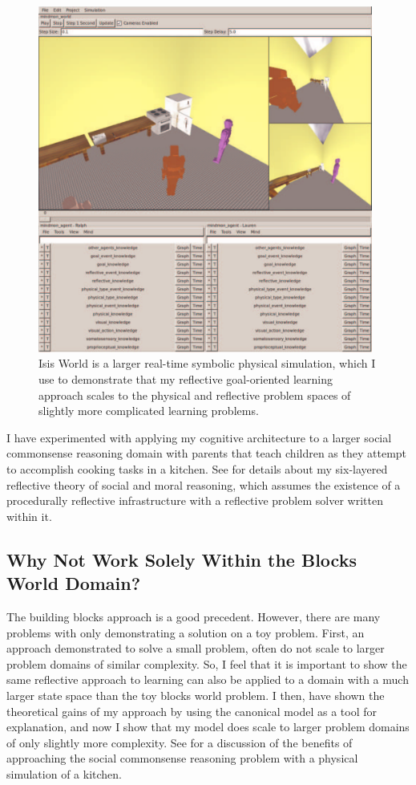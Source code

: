 \begin{figure}[bth]
  \center
  \includegraphics[width=11cm]{gfx/mindmon-isis_world-screenshot-1}
  \caption[Isis World is a larger physical simulation than the Blocks
    World toy problem]{Isis World is a larger real-time symbolic
    physical simulation, which I use to demonstrate that my reflective
    goal-oriented learning approach scales to the physical and
    reflective problem spaces of slightly more complicated learning
    problems.}
  \label{fig:mindmon-isis_world-screenshot-1}
\end{figure}

I have experimented with applying my cognitive architecture to a
larger social commonsense reasoning domain with parents that teach
children as they attempt to accomplish cooking tasks in a kitchen.
See \cite{morgan:2011} for details about my six-layered reflective
theory of social and moral reasoning, which assumes the existence of a
procedurally reflective infrastructure with a reflective problem
solver written within it.

\subsection{Why Not Work Solely Within the Blocks World Domain?}

The building blocks approach is a good precedent.  However, there are
many problems with only demonstrating a solution on a toy problem.
First, an approach demonstrated to solve a small problem, often do not
scale to larger problem domains of similar complexity.  So, I feel
that it is important to show the same reflective approach to learning
can also be applied to a domain with a much larger state space than
the toy blocks world problem.  I then, have shown the theoretical
gains of my approach by using the canonical model as a tool for
explanation, and now I show that my model does scale to larger
problem domains of only slightly more complexity.  See
\cite{smith:2010} for a discussion of the benefits of approaching the
social commonsense reasoning problem with a physical simulation of a
kitchen.

